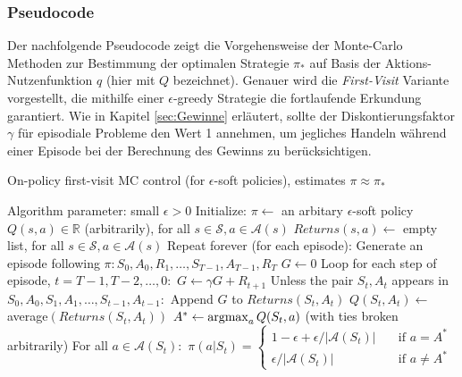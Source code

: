 \subsubsection{Pseudocode}
Der nachfolgende Pseudocode \cite[S.~101]{Sutton1998} zeigt die Vorgehensweise der Monte-Carlo Methoden zur Bestimmung der optimalen Strategie $\pi_*$ auf Basis der Aktions-Nutzenfunktion $q$ (hier mit $Q$ bezeichnet). Genauer wird die \textit{First-Visit} Variante vorgestellt, die mithilfe einer $\epsilon$-greedy Strategie die fortlaufende Erkundung garantiert. Wie in Kapitel \ref{sec:Gewinne} erläutert, sollte der Diskontierungsfaktor $\gamma$ für episodiale Probleme den Wert 1 annehmen, um jegliches Handeln während einer Episode bei der Berechnung des Gewinns zu berücksichtigen.
\par 
\begin{algorithm}
    \caption{On-policy first-visit MC control (for $\epsilon$-soft policies), estimates $\pi \approx \pi_*$}
    \begin{algorithmic}[1]
        \State Algorithm parameter: small $\epsilon > 0$
        \State Initialize:
        \Indent
           \State $\pi \gets$ an arbitary $\epsilon$-soft policy
           \State $Q(s,a) \in \mathbb{R}$ (arbitrarily), for all $s \in \mathcal{S}, a \in \mathcal{A}(s)$
           \State $Returns(s,a) \gets$ empty list, for all $s \in \mathcal{S}, a \in \mathcal{A}(s)$
        \EndIndent
        \State Repeat forever (for each episode):
        \Indent
            \State Generate an episode following $\pi: S_0, A_0, R_1, \dots, S_{T-1}, A_{T-1}, R_T$
            \State $G \gets 0$
            \State Loop for each step of episode, $t= T-1,T-2, \dots, 0:$
            \Indent
                \State $G \gets \gamma G + R_{t+1}$
                \State Unless the pair $S_t, A_t$ appears in $S_0, A_0, S_1, A_1, \dots ,S_{t-1}, A_{t-1}:$
                \Indent
                    \State Append $G$ to $Returns(S_t,A_t)$
                    \State $Q(S_t,A_t) \gets$ average$(Returns(S_t,A_t))$
                    \State $A^* \gets \operatorname*{argmax}_a Q(S_t, a)$ (with ties broken arbitrarily)
                    \State For all $a \in \mathcal{A}(S_t):$
                    \Indent
                     \State  $\pi(a|S_t) =   
                        \begin{cases}
                            1-\epsilon + \epsilon / |\mathcal{A}(S_t)|      & \quad \text{if } a = A^* \\
                            \epsilon / |\mathcal{A}(S_t)|  & \quad \text{if } a \neq A^*
                        \end{cases}$
                    \EndIndent
                \EndIndent
            \EndIndent
        \EndIndent 
    \end{algorithmic}
\end{algorithm}

